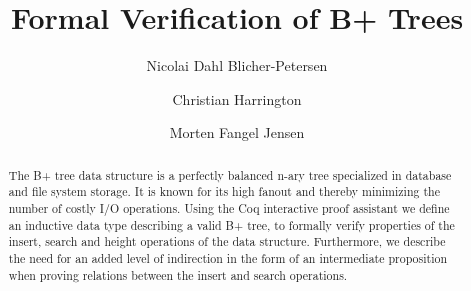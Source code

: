 \documentclass[oribibl]{llncs}
\begin{document}
\mainmatter
\title{Formal Verification of B+ Trees}
\author{Nicolai Dahl Blicher-Petersen \and Christian Harrington \and Morten Fangel Jensen \\
}

\maketitle

\begin{abstract}
The B+ tree data structure is a perfectly balanced n-ary tree specialized in database and file system storage. It is known for its high fanout and thereby minimizing the number of costly I/O operations. Using the Coq interactive proof assistant we define an inductive data type describing a valid B+ tree, to formally verify properties of the insert, search and height operations of the data structure. Furthermore, we describe the need for an added level of indirection in the form of an intermediate proposition when proving relations between the insert and search operations.

\end{abstract}










\end{document}

